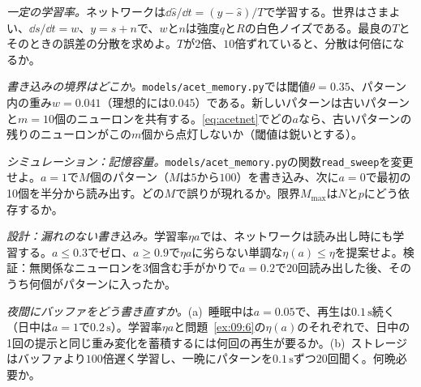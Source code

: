 \begin{exercise}[\lvlB]
\label{ex:09:3}
\emph{一定の学習率。}ネットワークは$\dd\hat s/\dd t=(y-\hat s)/T$で学習する。世界はさまよい、$\dd s/\dd t=w$、$y=s+n$で、$w$と$n$は強度$q$と$R$の白色ノイズである。最良の$T$とそのときの誤差の分散を求めよ。$T$が$2$倍、$10$倍ずれていると、分散は何倍になるか。
\end{exercise}

\begin{exercise}[\lvlB]
\label{ex:09:4}
\emph{書き込みの境界はどこか。}\texttt{models/\allowbreak acet\_memory.py}では閾値$\theta=0.35$、パターン内の重み$w=0.041$（理想的には$0.045$）である。新しいパターンは古いパターンと$m=10$個のニューロンを共有する。\eqref{eq:acetnet}でどの$a$なら、古いパターンの残りのニューロンがこの$m$個から点灯しないか（閾値は鋭いとする）。
\end{exercise}

\begin{exercise}[\lvlB]
\label{ex:09:5}
\emph{シミュレーション：記憶容量。}\texttt{models/\allowbreak acet\_memory.py}の関数\texttt{read\_sweep}を変更せよ。$a=1$で$M$個のパターン（$M$は$5$から$100$）を書き込み、次に$a=0$で最初の10個を半分から読み出す。どの$M$で誤りが現れるか。限界$M_{\max}$は$N$と$p$にどう依存するか。
\end{exercise}

\begin{exercise}[\lvlB]
\label{ex:09:6}
\emph{設計：漏れのない書き込み。}学習率$\eta a$では、ネットワークは読み出し時にも学習する。$a\le0.3$でゼロ、$a\ge0.9$で$\eta a$に劣らない単調な$\eta(a)\le\eta$を提案せよ。検証：無関係なニューロンを3個含む手がかりで$a=0.2$で$20$回読み出した後、そのうち何個がパターンに入ったか。
\end{exercise}

\begin{exercise}[\lvlC]
\label{ex:09:7}
\emph{夜間にバッファをどう書き直すか。}(a)~睡眠中は$a=0.05$で、再生は$0.1\,\text{s}$続く（日中は$a=1$で$0.2\,\text{s}$）。学習率$\eta a$と問題~\ref{ex:09:6}の$\eta(a)$のそれぞれで、日中の1回の提示と同じ重み変化を蓄積するには何回の再生が要るか。(b)~ストレージはバッファより$100$倍遅く学習し、一晩にパターンを$0.1\,\text{s}$ずつ$20$回聞く。何晩必要か。
\end{exercise}
